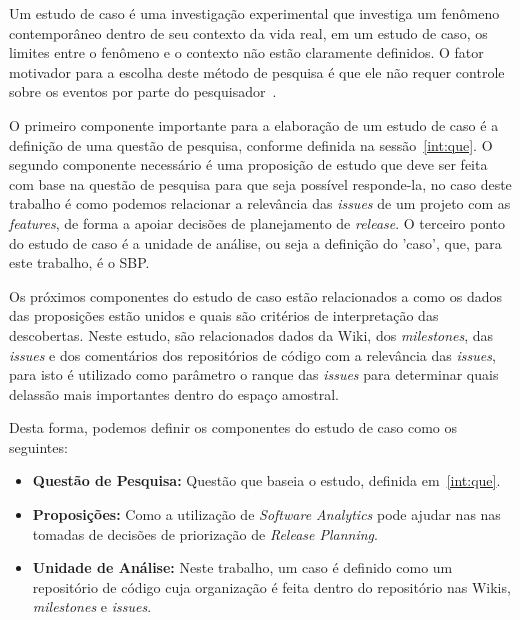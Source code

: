 Um estudo de caso é uma investigação experimental que investiga um fenômeno contemporâneo dentro de seu contexto da vida real, em um estudo de caso, os limites entre o fenômeno e o contexto não estão claramente definidos. O fator motivador para a escolha deste método de pesquisa é que ele não requer controle sobre os eventos por parte do pesquisador~\cite{yin}.

O primeiro componente importante para a elaboração de um estudo de caso é a definição de uma questão de pesquisa, conforme definida na sessão~\ref{int:que}. O segundo componente necessário é uma proposição de estudo que deve ser feita com base na questão de pesquisa para que seja possível responde-la, no caso deste trabalho é como podemos relacionar a relevância das \textit{issues} de um projeto com as \textit{features}, de forma a apoiar decisões de planejamento de \textit{release}. O terceiro ponto do estudo de caso é a unidade de análise, ou seja a definição do 'caso', que, para este trabalho, é o SBP.

Os próximos componentes do estudo de caso estão relacionados a como os dados das proposições estão unidos e quais são critérios de interpretação das descobertas. Neste estudo, são relacionados dados da Wiki, dos \textit{milestones}, das \textit{issues} e dos comentários dos repositórios de código com a relevância das \textit{issues}, para isto é utilizado como parâmetro o ranque das \textit{issues} para determinar quais delassão mais importantes dentro do espaço amostral.

Desta forma, podemos definir os componentes do estudo de caso como os seguintes:

\begin{itemize}
    \item \textbf{Questão de Pesquisa:} Questão que baseia o estudo, definida em~\ref{int:que}.
    \item \textbf{Proposições:} Como a utilização de \textit{Software Analytics} pode ajudar nas
    nas tomadas de decisões de priorização de \textit{Release Planning}.
    \item \textbf{Unidade de Análise:} Neste trabalho, um caso é definido como um repositório
        de código cuja organização é feita dentro do repositório nas Wikis, \textit{milestones}
        e \textit{issues}.
\end{itemize}

